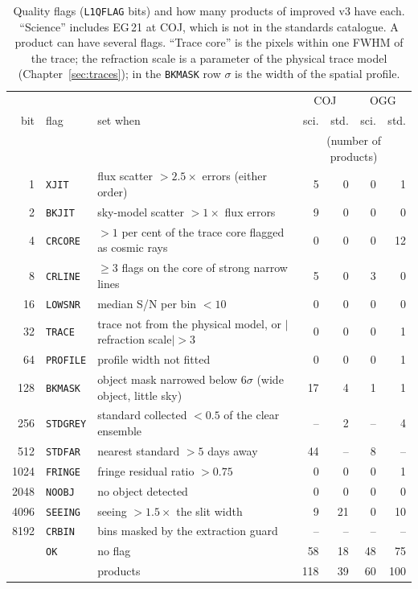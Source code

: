 \begin{table}[!htbp]
\centering
\caption{Quality flags (\texttt{L1QFLAG} bits) and how many products of improved v3 have each. ``Science''
includes EG\,21 at COJ, which is not in the standards catalogue. A product can have several flags. ``Trace core'' is
the pixels within one FWHM of the trace; the refraction scale is a parameter of the physical trace model
(Chapter~\ref{sec:traces}); in the \texttt{BKMASK} row $\sigma$ is the width of the spatial profile.}
\label{tab:qc_flags}
\small
\begin{tabular}{@{}rlp{6.4cm}rrrr@{}}
\toprule
 & & & \multicolumn{2}{c}{COJ} & \multicolumn{2}{c}{OGG} \\
bit & flag & set when & sci. & std. & sci. & std. \\
 & & & \multicolumn{4}{c}{(number of products)} \\
\midrule
1 & \texttt{XJIT} & flux scatter $>2.5\times$ errors (either order) & 5 & 0 & 0 & 1 \\
2 & \texttt{BKJIT} & sky-model scatter $>1\times$ flux errors & 9 & 0 & 0 & 0 \\
4 & \texttt{CRCORE} & $>1$ per cent of the trace core flagged as cosmic rays & 0 & 0 & 0 & 12 \\
8 & \texttt{CRLINE} & $\geq3$ flags on the core of strong narrow lines & 5 & 0 & 3 & 0 \\
16 & \texttt{LOWSNR} & median S/N per bin $<10$ & 0 & 0 & 0 & 0 \\
32 & \texttt{TRACE} & trace not from the physical model, or $|$refraction scale$|>3$ & 0 & 0 & 0 & 1 \\
64 & \texttt{PROFILE} & profile width not fitted & 0 & 0 & 0 & 1 \\
128 & \texttt{BKMASK} & object mask narrowed below 6$\sigma$ (wide object, little sky) & 17 & 4 & 1 & 1 \\
256 & \texttt{STDGREY} & standard collected $<0.5$ of the clear ensemble & -- & 2 & -- & 4 \\
512 & \texttt{STDFAR} & nearest standard $>5$ days away & 44 & -- & 8 & -- \\
1024 & \texttt{FRINGE} & fringe residual ratio $>0.75$ & 0 & 0 & 0 & 1 \\
2048 & \texttt{NOOBJ} & no object detected & 0 & 0 & 0 & 0 \\
4096 & \texttt{SEEING} & seeing $>1.5\times$ the slit width & 9 & 21 & 0 & 10 \\
8192 & \texttt{CRBIN} & bins masked by the extraction guard & -- & -- & -- & -- \\
\midrule
 & \texttt{OK} & no flag & 58 & 18 & 48 & 75 \\
 & & products & 118 & 39 & 60 & 100 \\
\bottomrule
\end{tabular}
\end{table}

